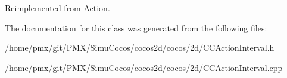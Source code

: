 Reimplemented from \hyperlink{classAction_a937e646e63915e33ad05ba149bfcf239}{Action}.



The documentation for this class was generated from the following files\+:\begin{DoxyCompactItemize}
\item 
/home/pmx/git/\+P\+M\+X/\+Simu\+Cocos/cocos2d/cocos/2d/C\+C\+Action\+Interval.\+h\item 
/home/pmx/git/\+P\+M\+X/\+Simu\+Cocos/cocos2d/cocos/2d/C\+C\+Action\+Interval.\+cpp\end{DoxyCompactItemize}
